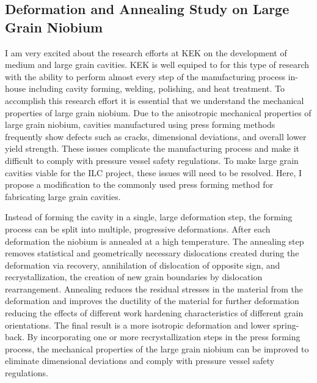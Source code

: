 \documentclass[]{revtex4-2}
\begin{document}
\subsection{Deformation and Annealing Study on Large Grain Niobium}

    I am very excited about the research efforts at KEK on the development of medium and large grain cavities. KEK is well equiped to for this type of research with the ability to perform almost every step of the manufacturing process in-house including cavity forming, welding, polishing, and heat treatment. To accomplish this research effort it is essential that we understand the mechanical properties of large grain niobium. Due to the anisotropic mechanical properties of large grain niobium, cavities manufactured using press forming methods frequently show defects such as cracks, dimensional deviations, and overall lower yield strength. These issues complicate the manufacturing process and make it difficult to comply with pressure vessel safety regulations. To make large grain cavities viable for the ILC project, these issues will need to be resolved. Here, I propose a modification to the commonly used press forming method for fabricating large grain cavities.

    Instead of forming the cavity in a single, large deformation step, the forming process can be split into multiple, progressive deformations. After each deformation the niobium is annealed at a high temperature. The annealing step removes statistical and geometrically necessary dislocations created during the deformation via recovery, annihilation of dislocation of opposite sign, and recrystallization, the creation of new grain boundaries by dislocation rearrangement. Annealing reduces the residual stresses in the material from the deformation and improves the ductility of the material for further deformation reducing the effects of different work hardening characteristics of different grain orientations. The final result is a more isotropic deformation and lower spring-back. By incorporating one or more recrystallization steps in the press forming process, the mechanical properties of the large grain niobium can be improved to eliminate dimensional deviations and comply with pressure vessel safety regulations.
\end{document}

